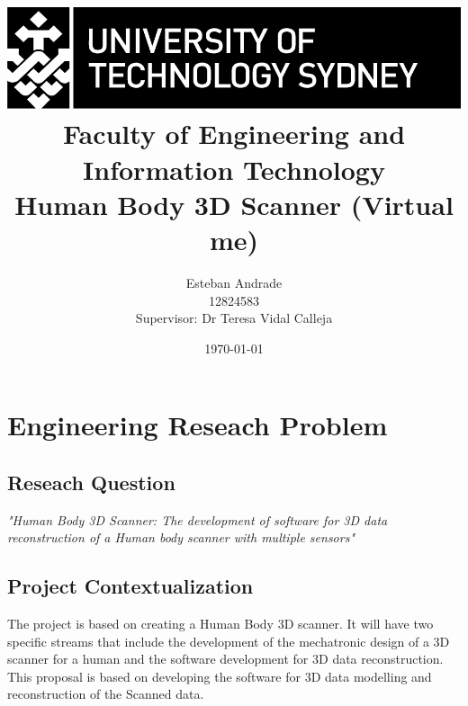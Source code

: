 \documentclass[12pt]{report}
\begin{document}
\begin{titlepage}

   

    \title{ \includegraphics[scale=1.7]{utslogo.jpg}\\[1cm]  
    Faculty of Engineering and Information Technology\\[1.0cm] 
    \Large{\textbf{Human Body 3D Scanner (Virtual me)}}\\}
    \author{Esteban Andrade\\ 
    12824583\\
    Supervisor: Dr Teresa Vidal Calleja\\}
    \date{\today}  
     \maketitle
     \cleardoublepage
\end{titlepage}

\tableofcontents
\listoffigures
\listoftables

\newpage
\setcounter{page}{1}

\chapter{Engineering Reseach Problem}

\section{Reseach Question}
\textit{\large{"Human Body 3D Scanner: The development of software for 3D data reconstruction of a Human body scanner with multiple sensors" }}

\section{Project Contextualization}
The project is based on creating a Human Body 3D scanner.
It will have two specific streams that include the development of the mechatronic design of a 3D scanner for a human and the software development for 3D data reconstruction. 
This proposal is based on developing the software for 3D data modelling and reconstruction of the Scanned data.
\end{document}
